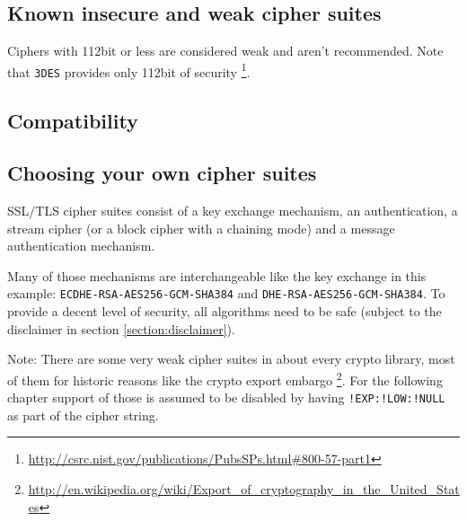 \subsection{Known insecure and weak cipher suites}

Ciphers with 112bit or less are considered weak and aren't recommended. Note that
\texttt{3DES} provides only 112bit of security
\footnote{\url{http://csrc.nist.gov/publications/PubsSPs.html\#800-57-part1}}.

\subsection{Compatibility}


\subsection{Choosing your own cipher suites}
\label{section:ChoosingYourOwnCipherSuites}


SSL/TLS cipher suites consist of a key exchange mechanism, an authentication, a
stream cipher (or a block cipher with a chaining mode) and a message authentication
mechanism.

Many of those mechanisms are interchangeable like the key exchange in this example:
\texttt{ECDHE-RSA-AES256-GCM-SHA384} and \texttt{DHE-RSA-AES256-GCM-SHA384}.
To provide a decent level of security, all algorithms need to be safe (subject to
the disclaimer in section \ref{section:disclaimer}).

Note: There are some very weak cipher suites in about every crypto library, most of
them for historic reasons like the crypto export embargo
\footnote{\url{http://en.wikipedia.org/wiki/Export_of_cryptography_in_the_United_States}}.
For the following chapter support of those is assumed to be disabled by having
\texttt{!EXP:!LOW:!NULL} as part of the cipher string.

